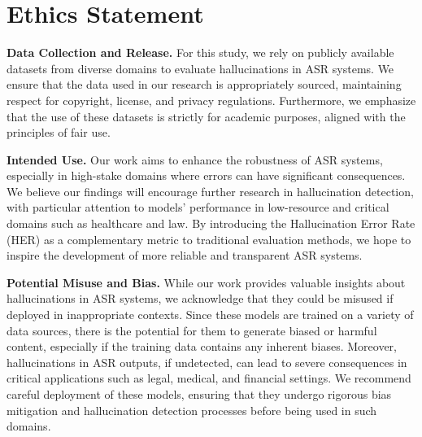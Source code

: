 \section{Ethics Statement}\label{sec:ethics_statement}

\noindent\textbf{Data Collection and Release.} 
For this study, we rely on publicly available datasets from diverse domains to evaluate hallucinations in ASR systems. We ensure that the data used in our research is appropriately sourced, maintaining respect for copyright, license, and privacy regulations. Furthermore, we emphasize that the use of these datasets is strictly for academic purposes, aligned with the principles of fair use. 

\noindent\textbf{Intended Use.} 
Our work aims to enhance the robustness of ASR systems, especially in high-stake domains where errors can have significant consequences. We believe our findings will encourage further research in hallucination detection, with particular attention to models' performance in low-resource and critical domains such as healthcare and law. By introducing the Hallucination Error Rate (HER) as a complementary metric to traditional evaluation methods, we hope to inspire the development of more reliable and transparent ASR systems.

\noindent \textbf{Potential Misuse and Bias.}
While our work provides valuable insights about hallucinations in ASR systems, we acknowledge that they could be misused if deployed in inappropriate contexts. Since these models are trained on a variety of data sources, there is the potential for them to generate biased or harmful content, especially if the training data contains any inherent biases. Moreover, hallucinations in ASR outputs, if undetected, can lead to severe consequences in critical applications such as legal, medical, and financial settings. We recommend careful deployment of these models, ensuring that they undergo rigorous bias mitigation and hallucination detection processes before being used in such domains.
